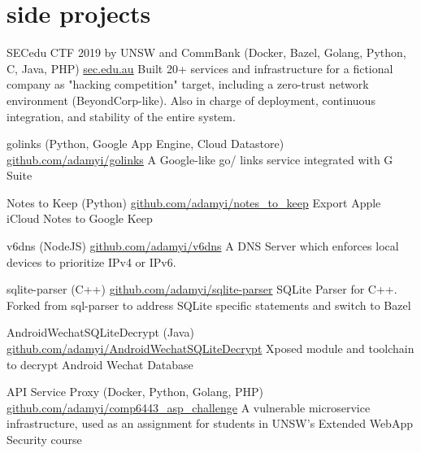 \documentclass[hidelinks__VERSION__]{adamyi-cv}
\begin{document}

\section{side projects}

\begin{entrylist}


\entry
{SECedu CTF 2019 by UNSW and CommBank (Docker, Bazel, Golang, Python, C, Java, PHP)}
{\href{https://sec.edu.au/}{sec.edu.au}}
{Built 20+ services and infrastructure for a fictional company as "hacking competition" target, including a zero-trust network environment (BeyondCorp-like). Also in charge of deployment, continuous integration, and stability of the entire system.}


\entry
{golinks (Python, Google App Engine, Cloud Datastore)}
{\href{https://github.com/adamyi/golinks}{github.com/adamyi/golinks}}
{A Google-like go/ links service integrated with G Suite}


\entry
{Notes to Keep (Python)}
{\href{https://github.com/adamyi/notes_to_keep}{github.com/adamyi/notes\_to\_keep}}
{Export Apple iCloud Notes to Google Keep}


\entry
{v6dns (NodeJS)}
{\href{https://github.com/adamyi/v6dns}{github.com/adamyi/v6dns}}
{A DNS Server which enforces local devices to prioritize IPv4 or IPv6.}


\entry
{sqlite-parser (C++)}
{\href{https://github.com/adamyi/sqlite-parser}{github.com/adamyi/sqlite-parser}}
{SQLite Parser for C++. Forked from sql-parser to address SQLite specific statements and switch to Bazel}


\entry
{AndroidWechatSQLiteDecrypt (Java)}
{\href{https://github.com/adamyi/AndroidWechatSQLiteDecrypt}{github.com/adamyi/AndroidWechatSQLiteDecrypt}}
{Xposed module and toolchain to decrypt Android Wechat Database}


\entry
{API Service Proxy (Docker, Python, Golang, PHP)}
{\href{https://github.com/adamyi/comp6443_asp_challenge}{github.com/adamyi/comp6443\_asp\_challenge}}
{A vulnerable microservice infrastructure, used as an assignment for students in UNSW's Extended WebApp Security course}


\end{entrylist}
\end{document}
